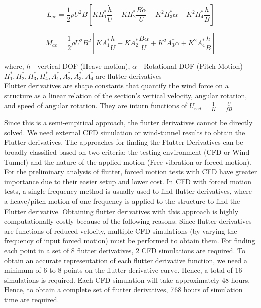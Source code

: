 \documentclass[../main]{subfiles}
\begin{document}
\begin{equation}
L_{ae} = \frac{1}{2}\rho U^2 B \left[ KH_1^* \frac{\dot{h}}{U} + KH_2^* \frac{B\dot{\alpha}}{U} + K^2 H_3^* \alpha + K^2 H_4^* \frac{h}{B} \right]
\end{equation}

\begin{equation}
M_{ae} = \frac{1}{2}\rho U^2 B^2 \left[ KA_1^* \frac{\dot{h}}{U} + KA_2^* \frac{B\dot{\alpha}}{U} + K^2 A_3^* \alpha + K^2 A_4^* \frac{h}{B} \right]
\end{equation}

where, $h$ - vertical DOF (Heave motion), $\alpha$ - Rotational DOF (Pitch Motion)\\
\phantom{where,} $H_1^*, H_2^*, H_3^*, H_4^*, A_1^*, A_2^*, A_3^*, A_4^*$ are flutter derivatives\\

Flutter derivatives are shape constants that quantify the wind force on a structure as a linear relation 
of the section's vertical velocity, angular rotation, and speed of angular rotation. They are inturn functions 
of $U_{red} = \frac{1}{K} = \frac{U}{fB}$ 

Since this is a semi-empirical approach, the flutter derivatives cannot be directly solved. We need 
external CFD simulation or wind-tunnel results to obtain the Flutter derivatives. The approaches 
for finding the Flutter Derivatives can be broadly classified based on two criteria: the testing 
environment (CFD or Wind Tunnel) and the nature of the applied motion (Free vibration or forced 
motion). For the preliminary analysis of flutter, forced motion tests with CFD have greater 
importance due to their easier setup and lower cost. In CFD with forced motion tests, a single 
frequency method is usually used to find flutter derivatives, where a heave/pitch motion of one 
frequency is applied to the structure to find the Flutter derivative. Obtaining flutter derivatives with 
this approach is highly computationally costly because of the following reasons. Since flutter 
derivatives are functions of reduced velocity, multiple CFD simulations (by varying the frequency 
of input forced motion) must be performed to obtain them. For finding each point in a set of 8 
flutter derivatives, 2 CFD simulations are required. To obtain an accurate representation of each 
flutter derivative function, we need a minimum of 6 to 8 points on the flutter derivative curve. 
Hence, a total of 16 simulations is required. Each CFD simulation will take approximately 48 hours. 
Hence, to obtain a complete set of flutter derivatives, 768 hours of simulation time are required.  
\end{document}
